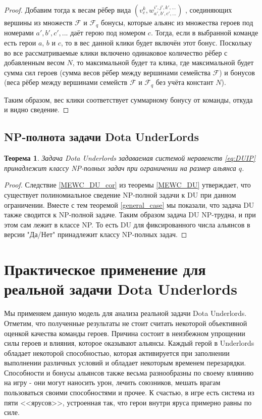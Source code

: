 \documentclass{article}
\newtheorem{theorem}{Теорема}
\begin{document}
\begin{proof}
Добавим тогда к весам рёбер вида  $(v_c^{k}, w_{a',b',c',...}^{i',j',k',...} )$ , соединяющих вершины из множеств 
$\mathcal{F}$ и $\mathcal{F}_q$ бонусы, которые альянс из множества героев под номерами $a', b', c',...$ даёт герою под номером $c$. Тогда, если в выбранной команде есть герои $a$, $b$ и $c$, то в вес данной клики будет включён этот бонус. Поскольку во все рассматриваемые клики включено одинаковое количество рёбер с добавленным весом $N$, то максимальной будет та клика, где максимальной будет сумма сил героев (сумма весов рёбер между вершинами семейства $\mathcal{F}$) и бонусов (веса рёбер между вершинами семейств $\mathcal{F}$ и $\mathcal{F}_q$ без учёта констант $N$).
    
Таким образом, вес клики соответствует суммарному бонусу от команды, откуда и видно сведение.
    
\end{proof}


\subsection{NP-полнота задачи Dota UnderLords}

\begin{theorem}
    Задача Dota Underlords задаваемая системой неравенств \eqref{eq:DUIP} принадлежит классу NP-полных задач при ограничении на размер альянса $q$.
\end{theorem}

\begin{proof}
	Следствие \ref{MEWC_DU_cor} из теоремы \ref{MEWC_DU} утверждает, что существует полиномиальное сведение NP-полной задачи к DU при данном ограничении. Вместе с тем теоремой \ref{general_case} мы показали, что задача DU также сводится к NP-полной задаче. Таким образом задача DU NP-трудна, и при этом сам лежит в классе NP. То есть DU для фиксированного числа альянсов в версии "Да/Нет" принадлежит классу NP-полных задач. 
\end{proof}

\section{Практическое применение для реальной задачи Dota Underlords}
\label{SectionComputationalResults}
  
Мы применяем данную модель для анализа реальной задачи Dota Underlords. Отметим, что полученные результаты не стоит считать некоторой объективной оценкой качества команды героев. Причина состоит в неизбежном упрощении силы героев и влияния, которое оказывают альянсы. Каждый герой в Underlords обладает некоторой способностью, которая активируется при заполнении выполнении различных условий и обладает некоторым временем перезарядки. Способности и бонусы альянсов также весьма разнообразны по своему влиянию на игру - они могут наносить урон, лечить союзников, мешать врагам пользоваться своими способностями и прочее. К счастью, в игре есть система из пяти <<ярусов>>, устроенная так, что герои внутри яруса примерно равны по силе.
\end{document}
